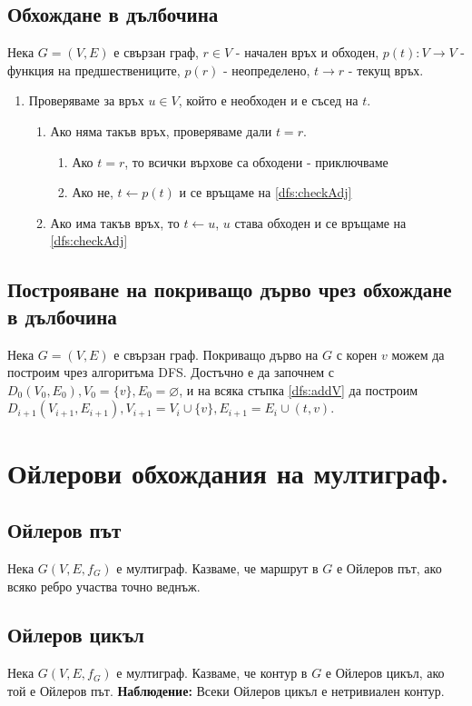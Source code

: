 \documentclass[fleqn,12pt]{article}
\begin{document}
\subsection{Обхождане в дълбочина} 
Нека $G = (V, E)$ е свързан граф, $r \in V$ - начален връх и обходен, 
$p(t) : V \rightarrow V$ - функция на предшествениците, $p(r)$ - неопределено, $t \rightarrow r$ - текущ връх.
\begin{enumerate}
	\item \label{dfs:checkAdj} Проверяваме за връх $u \in V$, който е необходен и е съсед на $t$.
	\begin{enumerate}
		\item Ако няма такъв връх, проверяваме дали $t = r$.
		\begin{enumerate}
			\item Ако $t = r$, то всички върхове са обходени - приключваме
			\item Ако не, $t \leftarrow p(t)$ и се връщаме на \ref{dfs:checkAdj}
		\end{enumerate}
		\item \label{dfs:addV} Ако има такъв връх, то $t \leftarrow u$, $u$ става обходен и се връщаме на \ref{dfs:checkAdj}
	\end{enumerate}
\end{enumerate} 

\subsection{Построяване на покриващо дърво чрез обхождане в дълбочина} 
Нека $G = (V, E)$ е свързан граф.
Покриващо дърво на $G$ с корен $v$ можем да построим чрез алгоритъма DFS. Достъчно е да започнем
с $D_0(V_0, E_0), V_0 = \{v\}, E_0 = \varnothing$, и на всяка стъпка \ref{dfs:addV} да построим
$D_{i + 1}(V_{i + 1}, E_{i + 1}), V_{i + 1} = V_i \cup \{ v \}, E_{i + 1} = E_i \cup (t, v)$.

\section{Ойлерови обхождания на мултиграф.}

\subsection{Ойлеров път} 
Нека $G(V,E,f_G)$ е мултиграф. Казваме, че маршрут в $G$ е Ойлеров път, ако всяко ребро
участва точно веднъж.

\subsection{Ойлеров цикъл} 
Нека $G(V,E,f_G)$ е мултиграф. Казваме, че контур в $G$ е Ойлеров цикъл, ако той е Ойлеров път.
\textbf{Наблюдение: } Всеки Ойлеров цикъл е нетривиален контур.
\end{document}
